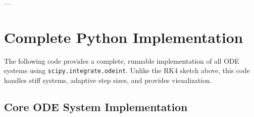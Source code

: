 ---


\section{Complete Python Implementation}
\label{ooo:python}

\begin{tcolorbox}[colback=gray!5!white, colframe=gray!75!black, title=Production-Ready Python Code]
The following code provides a complete, runnable implementation of all ODE systems using
\texttt{scipy.integrate.odeint}. Unlike the RK4 sketch above, this code handles stiff
systems, adaptive step sizes, and provides visualization.
\end{tcolorbox}

\subsection{Core ODE System Implementation}

